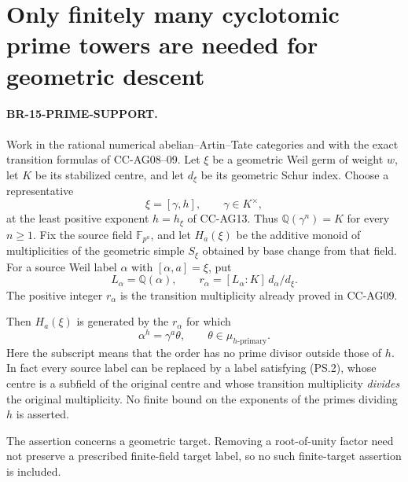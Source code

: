 \section{Only finitely many cyclotomic prime towers are needed for geometric descent}

\paragraph{BR-15-PRIME-SUPPORT.}
Work in the rational numerical abelian--Artin--Tate categories and with
the exact transition formulas of CC-AG08--09. Let $\xi$ be a geometric
Weil germ of weight $w$, let $K$ be its stabilized centre, and let
$d_\xi$ be its geometric Schur index. Choose a representative
\[
                  \xi=[\gamma,h],\qquad \gamma\in K^\times,
\]
at the least positive exponent $h=h_\xi$ of CC-AG13. Thus
$\mathbb Q(\gamma^n)=K$ for every $n\ge1$. Fix the source field
$\mathbb F_{p^a}$, and let $H_a(\xi)$ be the additive monoid of
multiplicities of the geometric simple $S_\xi$ obtained by base change
from that field. For a source Weil label $\alpha$ with
$[\alpha,a]=\xi$, put
\[
 L_\alpha=\mathbb Q(\alpha),\qquad
 r_\alpha=[L_\alpha:K]\,d_\alpha/d_\xi.
                                                               \tag{PS.1}
\]
The positive integer $r_\alpha$ is the transition multiplicity already
proved in CC-AG09.

Then $H_a(\xi)$ is generated by the $r_\alpha$ for which
\[
       \alpha^h=\gamma^a\theta,
       \qquad \theta\in\mu_{h\text{-primary}}.
                                                               \tag{PS.2}
\]
Here the subscript means that the order has no prime divisor outside
those of $h$. In fact every source label can be replaced by a label
satisfying (PS.2), whose centre is a subfield of the original centre
and whose transition multiplicity
\emph{divides} the original multiplicity. No finite bound on the
exponents of the primes dividing $h$ is asserted.

The assertion concerns a geometric target. Removing a root-of-unity
factor need not preserve a prescribed finite-field target label, so
no such finite-target assertion is included.

